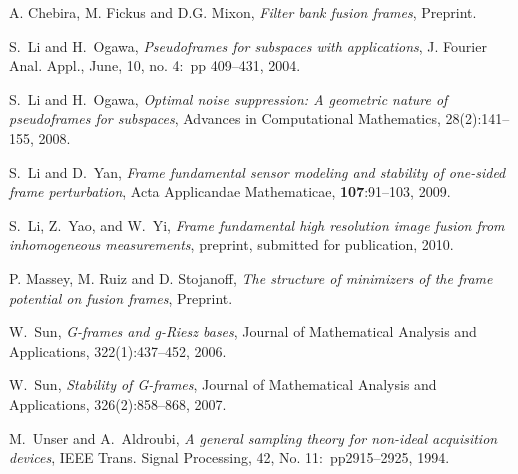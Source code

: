 \documentclass[11pt,reqno]{amsart}
\theoremstyle{remark}
\begin{document}
\begin{thebibliography}{WW}
  A. Chebira, M. Fickus and D.G. Mixon, {\it Filter bank fusion frames},
Preprint.

S.~Li and H.~Ogawa, {\em Pseudoframes for subspaces with applications}, 
J. Fourier Anal. Appl., {\rm June}, 10, no. 4:\ pp 409--431, 2004.

S.~Li and H.~Ogawa, {\em Optimal noise suppression: A geometric nature of pseudoframes for
  subspaces}, Advances in Computational Mathematics, 28(2):141--155, 2008.

S.~Li and D.~Yan, {\em Frame fundamental sensor modeling and stability of one-sided frame
  perturbation}, Acta Applicandae Mathematicae, {\bf 107}:91--103, 2009.

S.~Li, Z.~Yao, and W.~Yi, {\em Frame fundamental high resolution image fusion from inhomogeneous
  measurements}, {preprint, submitted for publication}, 2010.

  P. Massey, M. Ruiz and D. Stojanoff, {\it The structure of minimizers of the
frame potential on fusion frames}, Preprint.

W.~Sun, {\em G-frames and g-Riesz bases}, Journal of Mathematical Analysis and Applications, 322(1):437--452, 2006.

W.~Sun, {\em Stability of G-frames}, Journal of Mathematical Analysis and Applications, 326(2):858--868, 2007.

M.~Unser and A.~Aldroubi, {\em A general sampling theory for non-ideal acquisition devices}, IEEE Trans. Signal Processing, 42, No. 11:\ pp2915--2925, 1994.

\end{thebibliography}
\end{document}
